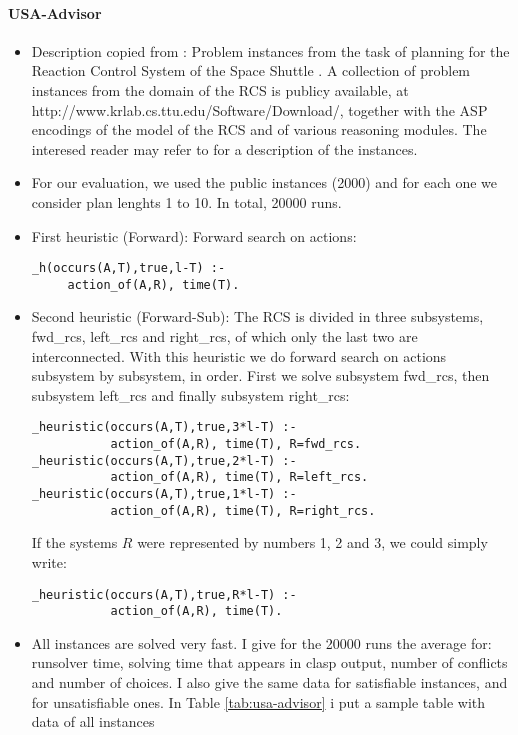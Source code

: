 
\paragraph{USA-Advisor}
\begin{itemize}
\item Description copied from \cite{balduccini10a}:
Problem instances from the task of planning for the Reaction Control System of the Space Shuttle \cite{balgelnog06a,nogueira03a}. 
A collection of problem instances from the domain of the RCS is publicy available, at 
http://www.krlab.cs.ttu.edu/Software/Download/,
together with the ASP encodings of the model of the RCS and of various reasoning modules.
The interesed reader may refer to \cite{nogueira03a} for a description of the instances.
\item 
For our evaluation, we used the public instances (2000) and for each 
one we consider plan lenghts 1 to 10. In total, 20000 runs. 
\item
First heuristic (Forward): Forward search on actions:
\begin{lstlisting}
_h(occurs(A,T),true,l-T) :- 
	 action_of(A,R), time(T).
\end{lstlisting}
\item
Second heuristic (Forward-Sub): The RCS is divided in three subsystems, 
fwd\_rcs, left\_rcs and right\_rcs, of which only the last two are interconnected.
With this heuristic we do forward search on actions subsystem by subsystem, in order. 
First we solve subsystem fwd\_rcs, then subsystem left\_rcs and finally subsystem right\_rcs:
\begin{lstlisting}
_heuristic(occurs(A,T),true,3*l-T) :- 
           action_of(A,R), time(T), R=fwd_rcs.
_heuristic(occurs(A,T),true,2*l-T) :- 
           action_of(A,R), time(T), R=left_rcs.
_heuristic(occurs(A,T),true,1*l-T) :- 
           action_of(A,R), time(T), R=right_rcs.
\end{lstlisting}
If the systems $R$ were represented by numbers 1, 2 and 3, we could simply write:
\begin{lstlisting}
_heuristic(occurs(A,T),true,R*l-T) :- 
           action_of(A,R), time(T).
\end{lstlisting}
\item All instances are solved very fast. 
I give for the 20000 runs the average for:
runsolver time, 
solving time that appears in clasp output, 
number of conflicts and number of choices. 
I also give the same data for satisfiable instances, 
and for unsatisfiable ones.
In Table \ref{tab:usa-advisor} i put a sample table with data of all instances  

\end{itemize}
